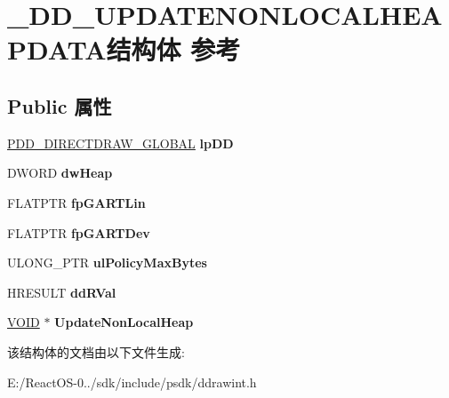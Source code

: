 \hypertarget{struct___d_d___u_p_d_a_t_e_n_o_n_l_o_c_a_l_h_e_a_p_d_a_t_a}{}\section{\+\_\+\+D\+D\+\_\+\+U\+P\+D\+A\+T\+E\+N\+O\+N\+L\+O\+C\+A\+L\+H\+E\+A\+P\+D\+A\+T\+A结构体 参考}
\label{struct___d_d___u_p_d_a_t_e_n_o_n_l_o_c_a_l_h_e_a_p_d_a_t_a}
\subsection*{Public 属性}
\begin{DoxyCompactItemize}
\item 
\mbox{\label{struct___d_d___u_p_d_a_t_e_n_o_n_l_o_c_a_l_h_e_a_p_d_a_t_a_ae2886273b4ed61178e6729a069b29b68}} 
\hyperlink{struct___d_d___d_i_r_e_c_t_d_r_a_w___g_l_o_b_a_l}{P\+D\+D\+\_\+\+D\+I\+R\+E\+C\+T\+D\+R\+A\+W\+\_\+\+G\+L\+O\+B\+AL} {\bfseries lp\+DD}
\item 
\mbox{\label{struct___d_d___u_p_d_a_t_e_n_o_n_l_o_c_a_l_h_e_a_p_d_a_t_a_ac5a652c9fd10633ea8f66107c57976e5}} 
D\+W\+O\+RD {\bfseries dw\+Heap}
\item 
\mbox{\label{struct___d_d___u_p_d_a_t_e_n_o_n_l_o_c_a_l_h_e_a_p_d_a_t_a_a52ad4e78d617a8bcd9a94584098d3d00}} 
F\+L\+A\+T\+P\+TR {\bfseries fp\+G\+A\+R\+T\+Lin}
\item 
\mbox{\label{struct___d_d___u_p_d_a_t_e_n_o_n_l_o_c_a_l_h_e_a_p_d_a_t_a_a680726703aecc50ab3a2bbc91c442692}} 
F\+L\+A\+T\+P\+TR {\bfseries fp\+G\+A\+R\+T\+Dev}
\item 
\mbox{\label{struct___d_d___u_p_d_a_t_e_n_o_n_l_o_c_a_l_h_e_a_p_d_a_t_a_a36b985e7d00db6d35b94f325ec7d2699}} 
U\+L\+O\+N\+G\+\_\+\+P\+TR {\bfseries ul\+Policy\+Max\+Bytes}
\item 
\mbox{\label{struct___d_d___u_p_d_a_t_e_n_o_n_l_o_c_a_l_h_e_a_p_d_a_t_a_abc9b4eac2796eba8007b153dd661b1b6}} 
H\+R\+E\+S\+U\+LT {\bfseries dd\+R\+Val}
\item 
\mbox{\label{struct___d_d___u_p_d_a_t_e_n_o_n_l_o_c_a_l_h_e_a_p_d_a_t_a_af0a2550d536ba72b08fccdb8a8539ab6}} 
\hyperlink{interfacevoid}{V\+O\+ID} $\ast$ {\bfseries Update\+Non\+Local\+Heap}
\end{DoxyCompactItemize}


该结构体的文档由以下文件生成\+:\begin{DoxyCompactItemize}
\item 
E\+:/\+React\+O\+S-\/0../sdk/include/psdk/ddrawint.\+h\end{DoxyCompactItemize}
